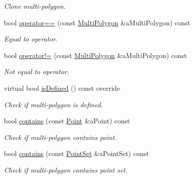 \begin{DoxyCompactItemize}
\begin{DoxyCompactList}\small\item\em Clone multi-\/polygon. \end{DoxyCompactList}\item 
bool \hyperlink{classostk_1_1math_1_1geom_1_1d2_1_1objects_1_1_multi_polygon_a8f3d731143998dacaaea1f0dffa9fa2c}{operator==} (const \hyperlink{classostk_1_1math_1_1geom_1_1d2_1_1objects_1_1_multi_polygon}{Multi\+Polygon} \&a\+Multi\+Polygon) const
\begin{DoxyCompactList}\small\item\em Equal to operator. \end{DoxyCompactList}\item 
bool \hyperlink{classostk_1_1math_1_1geom_1_1d2_1_1objects_1_1_multi_polygon_aa2c66641f9b699bdc4795d93078b8d8a}{operator!=} (const \hyperlink{classostk_1_1math_1_1geom_1_1d2_1_1objects_1_1_multi_polygon}{Multi\+Polygon} \&a\+Multi\+Polygon) const
\begin{DoxyCompactList}\small\item\em Not equal to operator. \end{DoxyCompactList}\item 
virtual bool \hyperlink{classostk_1_1math_1_1geom_1_1d2_1_1objects_1_1_multi_polygon_a27e84e80acbae4c2a7436a4d5c07b576}{is\+Defined} () const override
\begin{DoxyCompactList}\small\item\em Check if multi-\/polygon is defined. \end{DoxyCompactList}\item 
bool \hyperlink{classostk_1_1math_1_1geom_1_1d2_1_1objects_1_1_multi_polygon_a7b0795460707a8ee2cac31dfe7891466}{contains} (const \hyperlink{classostk_1_1math_1_1geom_1_1d2_1_1objects_1_1_point}{Point} \&a\+Point) const
\begin{DoxyCompactList}\small\item\em Check if multi-\/polygon contains point. \end{DoxyCompactList}\item 
bool \hyperlink{classostk_1_1math_1_1geom_1_1d2_1_1objects_1_1_multi_polygon_ad58e3e306864939951e8724bf9213d52}{contains} (const \hyperlink{classostk_1_1math_1_1geom_1_1d2_1_1objects_1_1_point_set}{Point\+Set} \&a\+Point\+Set) const
\begin{DoxyCompactList}\small\item\em Check if multi-\/polygon contains point set. \end{DoxyCompactList}\item 

\end{DoxyCompactItemize}
